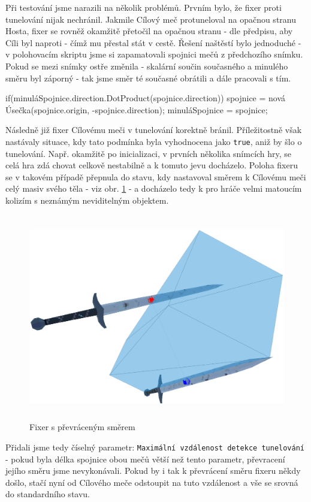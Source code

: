 Při testování jsme narazili na několik problémů. Prvním bylo, že fixer proti tunelování nijak nechránil. Jakmile Cílový meč protuneloval na opačnou stranu Hosta, fixer se rovněž okamžitě přetočil na opačnou stranu - dle předpisu, aby Cíli byl naproti - čímž mu přestal stát v cestě. Řešení naštěstí bylo jednoduché - v polohovacím skriptu jsme si zapamatovali spojnici mečů z předchozího snímku. Pokud se mezi snímky ostře změnila - skalární součin současného a minulého směru byl záporný - tak jsme směr té současné obrátili a dále pracovali s tím.
\begin{code}
  if(minuláSpojnice.direction.DotProduct(spojnice.direction))
    spojnice = nová Úsečka(spojnice.origin, -spojnice.direction);
  minuláSpojnice = spojnice;
\end{code}
Následně již fixer Cílovému meči v tunelování korektně bránil. Příležitostně však nastávaly situace, kdy tato podmínka byla vyhodnocena jako \texttt{true}, aniž by šlo o tunelování. Např. okamžitě po inicializaci, v prvních několika snímcích hry, se celá hra zdá chovat celkově nestabilně a k tomuto jevu docházelo. Poloha fixeru se v takovém případě přepnula do stavu, kdy nastavoval směrem k Cílovému meči celý masiv svého těla - viz obr. \ref{obr05:fixerOverturned} - a docházelo tedy k pro hráče velmi matoucím kolizím s neznámým neviditelným objektem. 

\begin{figure}[ht]\centering
  \center
  \includegraphics[height=90mm]{../img/fixerOverturned.png}
  \caption{Fixer s převráceným směrem}
  \label{obr05:fixerOverturned}
\end{figure} 

Přidali jsme tedy číselný parametr: \texttt{Maximální vzdálenost detekce tunelování} - pokud byla délka spojnice obou mečů větší než tento parametr, převracení jejího směru jsme nevykonávali. Pokud by i tak k převrácení směru fixeru někdy došlo, stačí nyní od Cílového meče odstoupit na tuto vzdálenost a vše se srovná do standardního stavu. 

